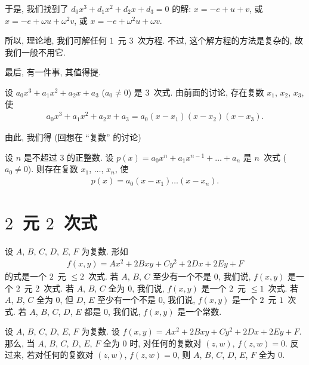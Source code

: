 \documentclass[../libro.tex]{subfiles}
\begin{document}
于是,
我们找到了
\(d_0 x^3 + d_1 x^2 + d_2 x + d_3 = 0\)
的解:
\(x = -e + u + v\),
或 \(x = -e + \omega u + \omega^2 v\),
或 \(x = -e + \omega^2 u + \omega v\).

所以, 理论地, 我们可解任何 \(1\)~元 \(3\)~次方程.
不过, 这个解方程的方法是复杂的,
故我们一般不用它.

最后, 有一件事, 其值得提.

设 \(a_0 x^3 + a_1 x^2 + a_2 x + a_3\) (\(a_0 \neq 0\))
是 \(3\)~次式.
由前面的讨论, 存在复数 \(x_1\), \(x_2\), \(x_3\),
使
\begin{align*}
    a_0 x^3 + a_1 x^2 + a_2 x + a_3
    = a_0 (x - x_1) (x - x_2) (x - x_3).
\end{align*}

由此, 我们得 (回想在 ``复数'' 的讨论)

\begin{theorem}
    设 \(n\) 是不超过 \(3\) 的正整数.
    设 \(p(x) = a_0 x^n + a_1 x^{n-1} + \dots + a_n\)
    是 \(n\)~次式
    (\(a_0 \neq 0\)).
    则存在复数 \(x_1\), \(\dots\), \(x_n\),
    使
    \begin{align*}
        p(x) = a_0 (x - x_1) \dots (x - x_n).
    \end{align*}
\end{theorem}

\section{\texorpdfstring{\(2\)~元 \(2\)~次式}%
{2 元 2 次式}}

设 \(A\), \(B\), \(C\), \(D\), \(E\), \(F\) 为复数.
形如
\begin{align*}
    f(x, y) = Ax^2 + 2Bxy + Cy^2 + 2Dx + 2Ey + F
\end{align*}
的式是一个 \(2\)~元 \({\leq} 2\)~次式.
若 \(A\), \(B\), \(C\) 至少有一个不是 \(0\),
我们说, \(f(x, y)\) 是一个 \(2\)~元 \(2\)~次式.
若 \(A\), \(B\), \(C\) 全为 \(0\),
我们说, \(f(x, y)\) 是一个 \(2\)~元 \({\leq} 1\)~次式.
若 \(A\), \(B\), \(C\) 全为 \(0\),
但 \(D\), \(E\) 至少有一个不是 \(0\),
我们说, \(f(x, y)\) 是一个 \(2\)~元 \(1\)~次式.
若 \(A\), \(B\), \(C\), \(D\), \(E\) 都是 \(0\),
我们说, \(f(x, y)\) 是一个常数.

\begin{theorem}
    设 \(A\), \(B\), \(C\), \(D\), \(E\), \(F\) 为复数.
    设 \(f(x, y) = Ax^2 + 2Bxy + Cy^2 + 2Dx + 2Ey + F\).
    那么, 当 \(A\), \(B\), \(C\), \(D\), \(E\), \(F\)
    全为 \(0\) 时,
    对任何的复数对 \((z, w)\),
    \(f(z, w) = 0\).
    反过来, 若对任何的复数对 \((z, w)\),
    \(f(z, w) = 0\),
    则 \(A\), \(B\), \(C\), \(D\), \(E\), \(F\)
    全为 \(0\).
\end{theorem}
\end{document}
